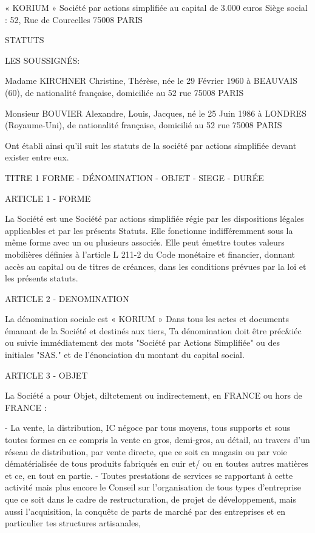 \documentclass{article}
\begin{document}
« KORIUM »
Société par actions simplifiée au capital de 3.000 euros
Siège social : 52, Rue de Courcelles
75008 PARIS

STATUTS

LES SOUSSIGNÉS:

Madame KIRCHNER Christine, Thérèse, née le 29 Février 1960 à BEAUVAIS (60), de
nationalité française, domiciliée au 52 rue 75008 PARIS

Monsieur BOUVIER Alexandre, Louis, Jacques, né le 25 Juin 1986 à LONDRES (Royaume-Uni), de
nationalité française, domicilié au 52 rue 75008 PARIS

Ont établi ainsi qu'il suit les statuts de la société par actions simplifiée
devant exister entre eux.

TITRE 1
FORME - DÉNOMINATION - OBJET - SIEGE - DURÉE

ARTICLE 1 - FORME

La Société est une Société par actions simplifiée régie par les dispositions légales applicables et
par les présents Statuts.
Elle fonctionne indifféremment sous la même forme avec un ou plusieurs associés.
Elle peut émettre toutes valeurs mobilières définies à l'article L 211-2 du Code monétaire et financier, donnant accès au capital ou de titres de créances, dans les conditions prévues par la loi et les présents statuts.

ARTICLE 2 - DENOMINATION

La dénomination sociale est « KORIUM »
Dans tous les actes et documents émanant de la Société et destinés aux tiers, Ta dénomination doit être préc&iéc ou suivie immédiatemcnt des mots "Société par Actions Simplifiée" ou des initiales "SAS." et de l'énonciation du montant du capital social.

ARTICLE 3 - OBJET

La Société a pour Objet, diltctement ou indirectement, en FRANCE ou hors de FRANCE :

- La vente, la distribution, IC négoce par tous moyens, tous supports et sous toutes formes en ce compris la vente en gros, demi-gros, au détail, au travers d'un réseau de distribution, par vente directe, que ce soit cn magasin ou par voie dématérialisée de tous produits fabriqués en cuir et/ ou en toutes autres matières et ce, en tout en partie.
- Toutes prestations de services se rapportant à cette activité mais plus encore le Conseil sur l'organisation de tous types d'entreprise que ce soit dans le cadre de restructuration, de projet de développement, mais aussi l'acquisition, la conquêtc de parts de marché par des entreprises et en particulier tes structures artisanales,
\end{document}
